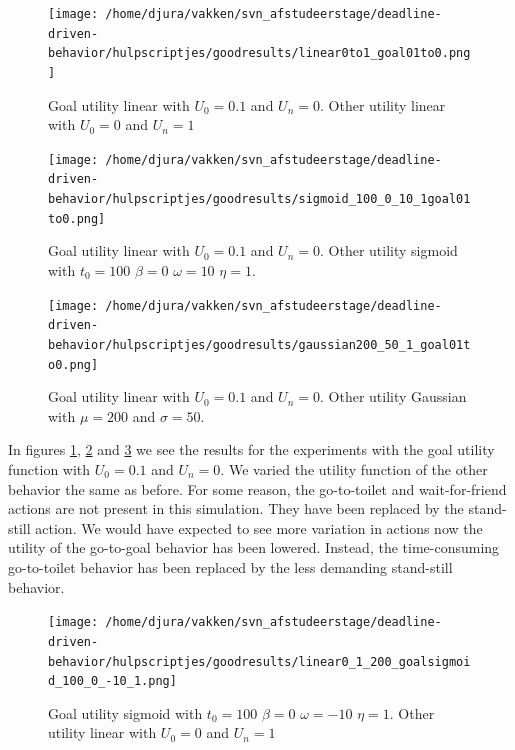 \documentclass[11pt, a4paper]{book}
\begin{document}
\begin{figure}[h!]
\centering
\texttt{[image: /home/djura/vakken/svn\_afstudeerstage/deadline-driven-behavior/hulpscriptjes/goodresults/linear0to1\_goal01to0.png]}
\caption{Goal utility linear with $U_0=0.1$ and $U_n=0$. Other utility linear with $U_0=0$ and $U_n=1$}
\label{fig:linear0to1_goal01to0}
\end{figure}

\begin{figure}[h!]
\centering
\texttt{[image: /home/djura/vakken/svn\_afstudeerstage/deadline-driven-behavior/hulpscriptjes/goodresults/sigmoid\_100\_0\_10\_1goal01to0.png]}
\caption{Goal utility linear with $U_0=0.1$ and $U_n=0$. Other utility sigmoid with $t_0=100$ $\beta=0$ $\omega=10$ $\eta=1$.}
\label{fig:sigmoid_100_0_10_1goal01to0}
\end{figure}

\begin{figure}[h!]
\centering
\texttt{[image: /home/djura/vakken/svn\_afstudeerstage/deadline-driven-behavior/hulpscriptjes/goodresults/gaussian200\_50\_1\_goal01to0.png]}
\caption{Goal utility linear with $U_0=0.1$ and $U_n=0$. Other utility Gaussian with $\mu=200$ and $\sigma=50$.}
\label{fig:gaussian200_50_1_goal01to0}
\end{figure}

In figures \ref{fig:linear0to1_goal01to0}, \ref{fig:sigmoid_100_0_10_1goal01to0} and \ref{fig:gaussian200_50_1_goal01to0} we see the results for the experiments with the goal utility function with $U_0=0.1$ and $U_n=0$. We varied the utility function of the other behavior the same as before. For some reason, the go-to-toilet and wait-for-friend actions are not present in this simulation. They have been replaced by the stand-still action. We would have expected to see more variation in actions now the utility of the go-to-goal behavior has been lowered. Instead, the time-consuming go-to-toilet behavior has been replaced by the less demanding stand-still behavior.

\begin{figure}[h!]
\centering
\texttt{[image: /home/djura/vakken/svn\_afstudeerstage/deadline-driven-behavior/hulpscriptjes/goodresults/linear0\_1\_200\_goalsigmoid\_100\_0\_-10\_1.png]}
\caption{Goal utility sigmoid with $t_0=100$ $\beta=0$ $\omega=-10$ $\eta=1$. Other utility linear with $U_0=0$ and $U_n=1$}
\label{fig:linear0_1_200_goalsigmoid_100_0_-10_1}
\end{figure}
\end{document}
